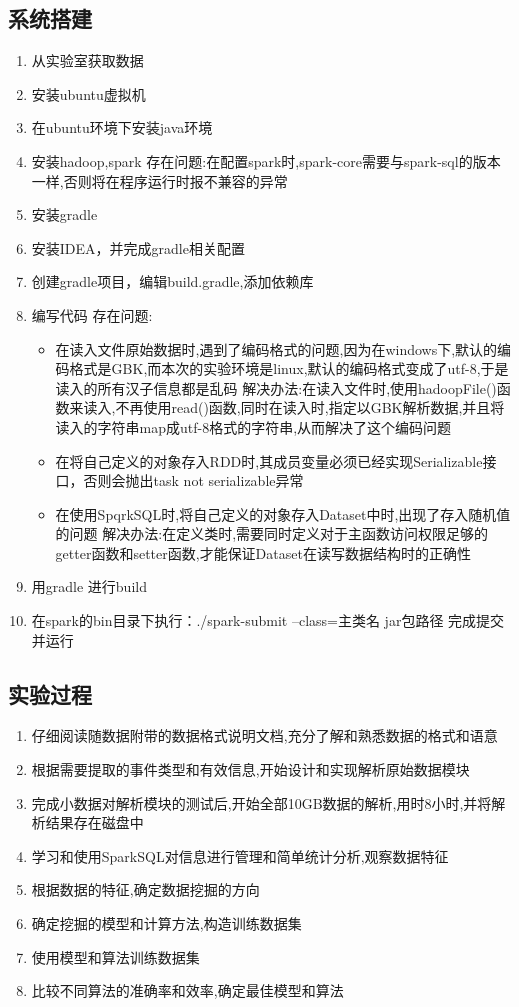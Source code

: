\documentclass{hitreport}
\begin{document}
\subsection{系统搭建}
\begin{enumerate}
  \item 从实验室获取数据
  \item 安装ubuntu虚拟机
  \item 在ubuntu环境下安装java环境
  \item 安装hadoop,spark
        存在问题:在配置spark时,spark-core需要与spark-sql的版本一样,否则将在程序运行时报不兼容的异常
  \item 安装gradle
  \item 安装IDEA，并完成gradle相关配置
  \item 创建gradle项目，编辑build.gradle,添加依赖库
  \item 编写代码
        存在问题:
        \begin{itemize}
          \item 在读入文件原始数据时,遇到了编码格式的问题,因为在windows下,默认的编码格式是GBK,而本次的实验环境是linux,默认的编码格式变成了utf-8,于是读入的所有汉子信息都是乱码
                解决办法:在读入文件时,使用hadoopFile()函数来读入,不再使用read()函数,同时在读入时,指定以GBK解析数据,并且将读入的字符串map成utf-8格式的字符串,从而解决了这个编码问题
          \item 在将自己定义的对象存入RDD时,其成员变量必须已经实现Serializable接口，否则会抛出task not serializable异常
          \item 在使用SpqrkSQL时,将自己定义的对象存入Dataset中时,出现了存入随机值的问题
                解决办法:在定义类时,需要同时定义对于主函数访问权限足够的getter函数和setter函数,才能保证Dataset在读写数据结构时的正确性
        \end{itemize}
  \item 用gradle 进行build
  \item 在spark的bin目录下执行：./spark-submit --class=主类名 jar包路径  完成提交并运行
\end{enumerate}
\subsection{实验过程}
\begin{enumerate}
  \item 仔细阅读随数据附带的数据格式说明文档,充分了解和熟悉数据的格式和语意
  \item 根据需要提取的事件类型和有效信息,开始设计和实现解析原始数据模块
  \item 完成小数据对解析模块的测试后,开始全部10GB数据的解析,用时8小时,并将解析结果存在磁盘中
  \item 学习和使用SparkSQL对信息进行管理和简单统计分析,观察数据特征
  \item 根据数据的特征,确定数据挖掘的方向
  \item 确定挖掘的模型和计算方法,构造训练数据集
  \item 使用模型和算法训练数据集
  \item 比较不同算法的准确率和效率,确定最佳模型和算法
\end{enumerate}
\end{document}
